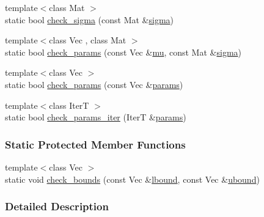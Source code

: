 \begin{DoxyCompactItemize}
\item 
{\footnotesize template$<$class Mat $>$ }\\static bool \hyperlink{classprior__hessian_1_1MultivariateNormalDist_ad0117306c61bf5b4615d40113dc27c83}{check\+\_\+sigma} (const Mat \&\hyperlink{classprior__hessian_1_1MultivariateNormalDist_aa4e86dd2b8e088553aac8c6b0fa50832}{sigma})
\item 
{\footnotesize template$<$class Vec , class Mat $>$ }\\static bool \hyperlink{classprior__hessian_1_1MultivariateNormalDist_a820f14758b3a02e29e0498e02fca7e07}{check\+\_\+params} (const Vec \&\hyperlink{classprior__hessian_1_1MultivariateNormalDist_a53e894d82ca08f285fc004b77301495d}{mu}, const Mat \&\hyperlink{classprior__hessian_1_1MultivariateNormalDist_aa4e86dd2b8e088553aac8c6b0fa50832}{sigma})
\item 
{\footnotesize template$<$class Vec $>$ }\\static bool \hyperlink{classprior__hessian_1_1MultivariateNormalDist_a5614521dfb960dc16906c02b21e6e472}{check\+\_\+params} (const Vec \&\hyperlink{classprior__hessian_1_1MultivariateNormalDist_a55a53ff4ea86375a8971a5334c000c9c}{params})
\item 
{\footnotesize template$<$class IterT $>$ }\\static bool \hyperlink{classprior__hessian_1_1MultivariateNormalDist_a894120a427347c2bd834ae0abab32e29}{check\+\_\+params\+\_\+iter} (IterT \&\hyperlink{classprior__hessian_1_1MultivariateNormalDist_a55a53ff4ea86375a8971a5334c000c9c}{params})
\end{DoxyCompactItemize}
\subsubsection*{Static Protected Member Functions}
\begin{DoxyCompactItemize}
\item 
{\footnotesize template$<$class Vec $>$ }\\static void \hyperlink{classprior__hessian_1_1MultivariateDist_afdc57126708d3ef19be759496aceeda6}{check\+\_\+bounds} (const Vec \&\hyperlink{classprior__hessian_1_1MultivariateNormalDist_a492a872d5cfb8838225ac782b801a865}{lbound}, const Vec \&\hyperlink{classprior__hessian_1_1MultivariateNormalDist_a80a35218c42430f7a5162229779f1492}{ubound})
\end{DoxyCompactItemize}


\subsubsection{Detailed Description}

